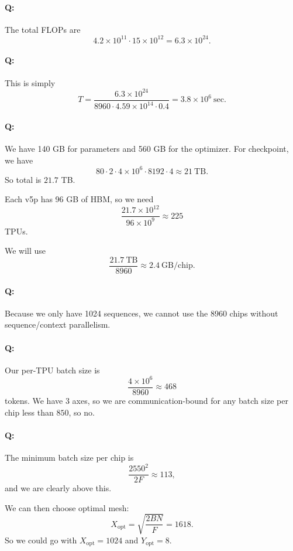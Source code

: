 \documentclass[11pt]{article}
\newcommand{\F}{F}
\newcommand{\quizbreak}{\Needspace{6\baselineskip}}
\begin{document}
\quizbreak
\paragraph{Q:}
The total FLOPs are
\[
  4.2\times 10^{11}\cdot 15\times 10^{12}
  =
  6.3\times 10^{24}.
\]

\quizbreak
\paragraph{Q:}
This is simply
\[
  T=
  \frac{6.3\times 10^{24}}
       {8960\cdot 4.59\times 10^{14}\cdot 0.4}
  =
  3.8\times 10^6\ \mathrm{sec}.
\]

\quizbreak
\paragraph{Q:}
We have 140 GB for parameters and 560 GB for the optimizer. For checkpoint, we have
\[
  80\cdot 2\cdot 4\times 10^6\cdot 8192\cdot 4
  \approx 21\ \mathrm{TB}.
\]
So total is $21.7$ TB.

Each v5p has 96 GB of HBM, so we need
\[
  \frac{21.7\times 10^{12}}{96\times 10^9}
  \approx 225
\]
TPUs.

We will use
\[
  \frac{21.7\ \mathrm{TB}}{8960}\approx 2.4\ \mathrm{GB/chip}.
\]

\quizbreak
\paragraph{Q:}
Because we only have 1024 sequences, we cannot use the 8960 chips without sequence/context parallelism.

\quizbreak
\paragraph{Q:}
Our per-TPU batch size is
\[
  \frac{4\times 10^6}{8960}\approx 468
\]
tokens. We have 3 axes, so we are communication-bound for any batch size per chip less than $850$, so no.

\quizbreak
\paragraph{Q:}
The minimum batch size per chip is
\[
  \frac{2550^2}{2\F}\approx 113,
\]
and we are clearly above this.

We can then choose optimal mesh:
\[
  X_{\mathrm{opt}}=\sqrt{\frac{2BN}{\F}}=1618.
\]
So we could go with $X_{\mathrm{opt}}=1024$ and $Y_{\mathrm{opt}}=8$.
\end{document}
